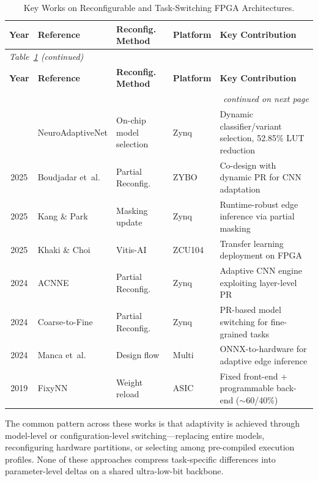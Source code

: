 \documentclass[12pt, a4paper]{report}
\numberwithin{equation}{chapter}
\numberwithin{figure}{chapter}
\numberwithin{table}{chapter}
\numberwithin{algorithm}{chapter}
\begin{document}
{\footnotesize
\renewcommand{\arraystretch}{0.95}
\begin{longtable}{@{}c l l l p{4.8cm}@{}}
\caption{Key Works on Reconfigurable and Task-Switching FPGA Architectures.}
\label{tab:related_reconfig}\\
\toprule
\textbf{Year} & \textbf{Reference} & \textbf{Reconfig. Method} & \textbf{Platform} & \textbf{Key Contribution} \\
\midrule
\endfirsthead
\multicolumn{5}{l}{\footnotesize\emph{Table~\ref{tab:related_reconfig} (continued)}}\\
\toprule
\textbf{Year} & \textbf{Reference} & \textbf{Reconfig. Method} & \textbf{Platform} & \textbf{Key Contribution} \\
\midrule
\endhead
\midrule
\multicolumn{5}{r}{\footnotesize\emph{continued on next page}}\\
\endfoot
\bottomrule
\endlastfoot
2025 & NeuroAdaptiveNet \cite{ElBouazzaoui2025NeuroAdaptive} & On-chip model selection & Zynq & Dynamic classifier/variant selection, 52.85\% LUT reduction \\
2025 & Boudjadar et~al. \cite{Boudjadar2025DynamicFPGA}     & Partial Reconfig.  & ZYBO     & Co-design with dynamic PR for CNN adaptation \\
2025 & Kang \& Park \cite{Kang2025RuntimeRobust}            & Masking update     & Zynq     & Runtime-robust edge inference via partial masking \\
2025 & Khaki \& Choi \cite{Khaki2025OptimizingDL}           & Vitis-AI           & ZCU104   & Transfer learning deployment on FPGA \\
2024 & ACNNE \cite{Huang2024ACNNE}                          & Partial Reconfig.  & Zynq     & Adaptive CNN engine exploiting layer-level PR \\
2024 & Coarse-to-Fine \cite{Rangsikunpum2024CoarseToFine}    & Partial Reconfig.  & Zynq     & PR-based model switching for fine-grained tasks \\
2024 & Manca et~al. \cite{Manca2024ONNXtoHW}                & Design flow        & Multi    & ONNX-to-hardware for adaptive edge inference \\
2019 & FixyNN \cite{Whatmough2019FixyNN}                    & Weight reload      & ASIC     & Fixed front-end + programmable back-end ($\sim$60/40\%) \\
\end{longtable}
}

The common pattern across these works is that adaptivity is achieved through model-level or configuration-level switching---replacing entire models, reconfiguring hardware partitions, or selecting among pre-compiled execution profiles. None of these approaches compress task-specific differences into parameter-level deltas on a shared ultra-low-bit backbone.
\end{document}
